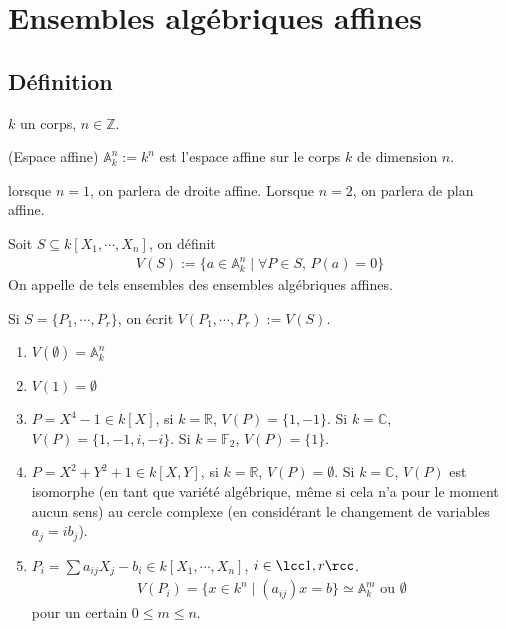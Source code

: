 
    \chapter{Ensembles algébriques affines}
        \section{Définition}
            $k$ un corps, $n \in \mathbb{Z}$.
            \begin{defi} (Espace affine)
                $\mathbb{A}^n_k := k^n$ est l'espace affine sur le corps $k$ de dimension $n$.
            \end{defi}
            lorsque $n = 1$, on parlera de droite affine. Lorsque $n = 2$, on parlera de plan affine.
            \begin{defi}
                Soit $S \subseteq k[X_1, \cdots, X_n]$, on définit
                \begin{align*}
                    V(S) := \{a \in \mathbb{A}_k^n \mid \forall P \in S ,\, P(a) = 0 \}
                \end{align*}
                On appelle de tels ensembles des ensembles algébriques affines.
            \end{defi}
            \begin{remq}
                Si $S = \{P_1, \cdots, P_r\}$, on écrit $V(P_1, \cdots, P_r) := V(S)$.
            \end{remq}
            \begin{expl}
                \begin{enumerate}
                    \item $V(\emptyset) = \mathbb{A}_k^n$
                    \item $V(1) = \emptyset$
                    \item $P = X^4 - 1 \in k[X]$, si $k = \mathbb{R}$, $V(P) = \{1, -1\}$. Si $k = \mathbb{C}$, $V(P) = \{1,-1,i,-i\}$. Si $k = \mathbb{F}_2$, $V(P) = \{1\}$.
                    \item $P = X^2 + Y^2 + 1 \in k[X,Y]$, si $k = \mathbb{R}$, $V(P) = \emptyset$. Si $k = \mathbb{C}$, $V(P)$ est isomorphe (en tant que variété algébrique, même si cela n'a pour le moment aucun sens) au cercle complexe (en considérant le changement de variables $a_j = ib_j$).
                    \item $P_i = \sum a_{ij} X_j - b_i \in k[X_1, \cdots, X_n]$, $i \in \lcc 1,r \rcc$.
                    \begin{align*}
                        V(P_i) = \{x \in k^n \mid (a_{ij})x = b\} \simeq \mathbb{A}_k^m \text{ ou } \emptyset
                    \end{align*}
                    pour un certain $0 \leq m \leq n$.
                \end{enumerate}
            \end{expl}
